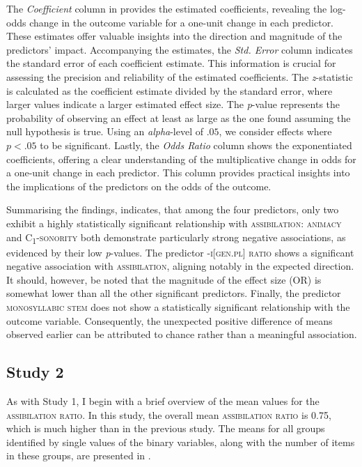 \documentclass[output=paper,colorlinks,citecolor=brown]{langscibook}
\begin{document}
The \textit{Coefficient} column in  provides the estimated coefficients, revealing the log-odds change in the outcome variable for a one-unit change in each predictor. These estimates offer valuable insights into the direction and magnitude of the predictors' impact. Accompanying the estimates, the \textit{Std. Error} column indicates the standard error of each coefficient estimate. This information is crucial for assessing the precision and reliability of the estimated coefficients. The \textit{z}-statistic is calculated as the coefficient estimate divided by the standard error, where larger values
indicate a larger estimated effect size. The \textit{p}-value represents the probability of observing an effect at least as large as the one found assuming the null hypothesis is true. Using an \textit{alpha}-level of $.05$, we consider effects
where $\textit{p} < .05$ to be significant. Lastly, the \textit{Odds Ratio} column shows the exponentiated coefficients, offering a clear understanding of the multiplicative change in odds for a one-unit change in each predictor. This column provides practical insights into the implications of the predictors on the odds of the outcome.

Summarising the findings,  indicates, that among the four predictors, only two exhibit a highly statistically significant relationship with \textsc{assibilation}: \textsc{animacy} and \textsc{C\textsubscript{1}-sonority} both demonstrate particularly strong negative associations, as evidenced by their low \textit{p}-values. The predictor \textsc{\nobreakdash-i[gen.pl] ratio} shows a significant negative association with \textsc{assibilation}, aligning notably in the expected direction. It should, however, be noted that the magnitude of the effect size (OR) is somewhat lower than all the other significant predictors. Finally, the predictor \textsc{monosyllabic stem} does not show a statistically significant relationship with the outcome variable. Consequently, the unexpected positive difference of means observed earlier can be attributed to chance rather than a meaningful association.

\subsection{Study 2}
\label{sim:sec:results2}

As with Study 1, I begin with a brief overview of the mean values for the \textsc{assibilation ratio}. In this study, the overall mean \textsc{assibilation ratio} is 0.75, which is much higher than in the previous study. The means for all groups identified by single values of the binary variables, along with the number of items in these groups, are presented in .
\end{document}

